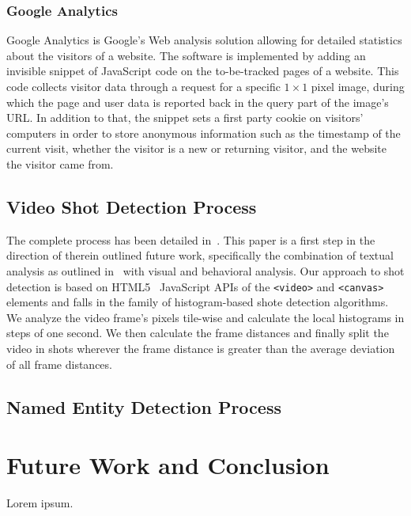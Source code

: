 \documentclass[runningheads,a4paper]{llncs}
\begin{document}
\subsubsection{Google Analytics}
Google Analytics is Google's Web analysis solution allowing for detailed statistics about the visitors of a website. The software is implemented by adding an invisible snippet of JavaScript code on the to-be-tracked pages of a website. This code collects visitor data through a request for a specific $1 \times 1$ pixel image, during which the page and user data is reported back in the query part of the image's URL. In addition to that, the snippet sets a first party cookie on visitors' computers in order to store anonymous information such as the timestamp of the current visit, whether the visitor is a new or returning visitor, and the website the visitor came from.

\subsection{Video Shot Detection Process}
The complete process has been detailed in~\cite{artemis}. This paper is a first step in the direction of therein outlined future work, specifically the combination of textual analysis as outlined in~\cite{semwebvid} with visual and behavioral analysis. Our approach to shot detection is based on HTML5~\cite{w3c_html5} JavaScript APIs of the \texttt{<video>} and \texttt{<canvas>} elements and falls in the family of histogram-based shote detection algorithms. We analyze the video frame's pixels tile-wise and calculate the local histograms in steps of one second. We then calculate the frame distances and finally split the video in shots wherever the frame distance is greater than the average deviation of all frame distances.

\subsection{Named Entity Detection Process}


\section{Future Work and Conclusion} \label{sec:future-work-conclusion}
Lorem ipsum.

\renewcommand{\ttdefault}{cmvtt}
\renewcommand\UrlFont\tt



\end{document}
